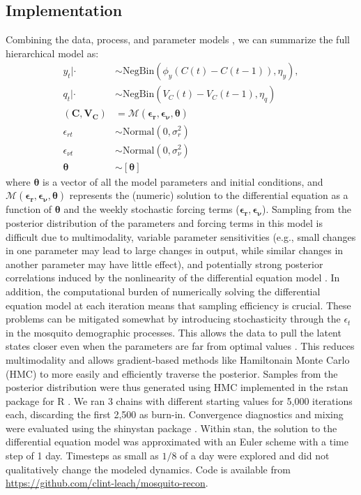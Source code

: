 \documentclass[10pt,letterpaper]{article}
\begin{document}
\subsection*{Implementation}

Combining the data, process, and parameter models \cite{Berliner1996}, we can summarize the full hierarchical model as:
\begin{align}
y_t | \cdot & \sim \text{NegBin}(\phi_y (C(t) - C(t-1)), \eta_y),
\\
q_t | \cdot &\sim \text{NegBin}(V_{C}(t) - V_{C}(t-1), \eta_q)\\
(\mathbf{C}, \mathbf{V_C}) & = \mathcal{M}(\boldsymbol{\epsilon_r}, \boldsymbol{\epsilon_{\nu}},\boldsymbol{\theta})\\
\epsilon_{rt} & \sim \text{Normal}(0, \sigma^2_r)\\
\epsilon_{\nu t} & \sim \text{Normal}(0, \sigma^2_{\nu})\\
\boldsymbol{\theta} & \sim [\boldsymbol{\theta}]
\end{align}
where $\boldsymbol{\theta}$ is a vector of all the model parameters and initial conditions, and $\mathcal{M}(\boldsymbol{\epsilon_r}, \boldsymbol{\epsilon_{\nu}},\boldsymbol{\theta})$ represents the (numeric) solution to the differential equation as a function of $\boldsymbol{\theta}$ and the weekly stochastic forcing terms ($\boldsymbol{\epsilon_{r}}, \boldsymbol{\epsilon_{\nu}}$).
Sampling from the posterior distribution of the parameters and forcing terms in this model is difficult due to multimodality, variable parameter sensitivities (e.g., small changes in one parameter may lead to large changes in output, while similar changes in another parameter may have little effect), and potentially strong posterior correlations induced by the nonlinearity of the differential equation model \cite{Reilly2005, Girolami2008, Calderhead2011}.
In addition, the computational burden of numerically solving the differential equation model at each iteration means that sampling efficiency is crucial.
These problems can be mitigated somewhat by introducing stochasticity through the $\epsilon_t$ in the mosquito demographic processes.
This allows the data to pull the latent states closer even when the parameters are far from optimal values \cite{Leander2014}.
This reduces multimodality and allows gradient-based methods like Hamiltonain Monte Carlo (HMC) to more easily and efficiently traverse the posterior.
Samples from the posterior distribution were thus generated using HMC implemented in the rstan package \cite{Carpenter2016, Rstan2017} for R \cite{R2016}. 
We ran 3 chains with different starting values for 5,000 iterations each, discarding the first 2,500 as burn-in.
Convergence diagnostics and mixing were evaluated using the shinystan package \cite{shinystan}.
Within stan, the solution to the differential equation model was approximated with an Euler scheme with a time step of 1 day.  
Timesteps as small as $1/8$ of a day were explored and did not qualitatively change the modeled dynamics.
Code is available from \href{https://github.com/clint-leach/mosquito-recon}{https://github.com/clint-leach/mosquito-recon}.
\end{document}
